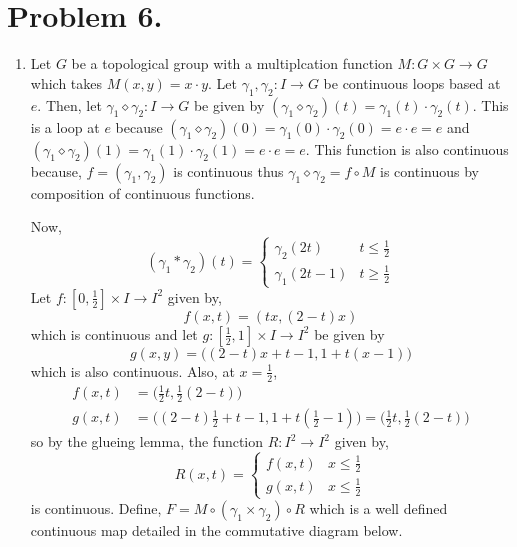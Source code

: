 \documentclass[12pt]{extarticle}
\begin{document}
\section*{Problem 6.}   
\begin{enumerate} 
\item
Let $G$ be a topological group with a multiplcation function $M : G \times G \to G$ which takes $M(x,y) = x \cdot y$. Let $\gamma_1, \gamma_2 : I \to G$ be continuous loops based at $e$. Then, let $\gamma_1 \diamond \gamma_2 : I \to G$ be given by $(\gamma_1 \diamond \gamma_2)(t) = \gamma_1(t) \cdot \gamma_2(t)$. This is a loop at $e$ because $(\gamma_1 \diamond \gamma_2)(0) = \gamma_1(0) \cdot \gamma_2(0) = e \cdot e = e$ and
$(\gamma_1 \diamond \gamma_2)(1) = \gamma_1(1) \cdot \gamma_2(1) = e \cdot e = e$. This function is also continuous because, $f = (\gamma_1, \gamma_2)$ is continuous thus $\gamma_1 \diamond \gamma_2 = f \circ M$ is continuous by composition of continuous functions.
 
\begin{center}
\end{center}   

Now, 
\[(\gamma_1 * \gamma_2)(t) = 
\begin{cases}
\gamma_2(2t) & t \le \frac{1}{2} \\
\gamma_1(2t - 1) & t \ge \frac{1}{2}
\end{cases}\]
Let $f : [0, \tfrac{1}{2}] \times I \to I^2$ given by, 
\[f(x, t) = (tx, (2-t)x)\]
which is continuous and let $g : [\tfrac{1}{2}, 1] \times I \to I^2$ be given by 
\[g(x,y) = \big((2-t)x + t - 1, 1 + t(x - 1)\big)\]
which is also continuous. Also, at $x = \frac{1}{2}$, 
\begin{align*}
f(x, t) & = \big( \tfrac{1}{2} t, \tfrac{1}{2}(2-t) \big) \\
g(x, t) & = \big((2 - t) \tfrac{1}{2} + t - 1, 1 + t(\tfrac{1}{2} - 1)\big) = \big(\tfrac{1}{2} t, \tfrac{1}{2}(2-t)\big)
\end{align*}
so by the glueing lemma, the function $R : I^2 \to I^2$ given by,
\[ R(x,t) = 
\begin{cases}
f(x,t) & x \le \frac{1}{2} \\
g(x,t) & x \le \frac{1}{2}
\end{cases}\]
is continuous. Define, $F = M \circ (\gamma_1 \times \gamma_2) \circ R$ which is a well defined continuous map detailed in the commutative diagram below.


\end{enumerate}
\end{document}
